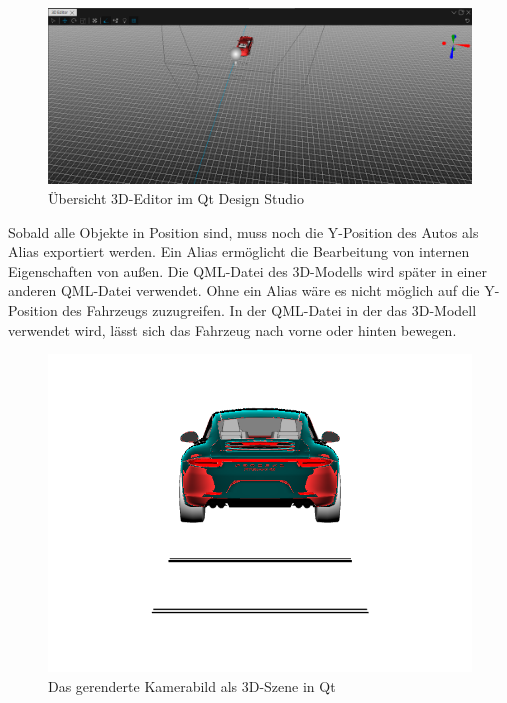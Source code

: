 \begin{figure}[htb]
	\centering
	\includegraphics[width=\textwidth]{img/4_hmi_tools/3d_editor}
	\caption[3D-Editor in Qt]{Übersicht 3D-Editor im Qt Design Studio}
	\label{fig:qt_3d}
\end{figure}

Sobald alle Objekte in Position sind, muss noch die Y-Position des Autos als Alias exportiert werden. Ein Alias ermöglicht die Bearbeitung von internen Eigenschaften von außen. Die QML-Datei des 3D-Modells wird später in einer anderen QML-Datei verwendet. Ohne ein Alias wäre es nicht möglich auf die Y-Position des Fahrzeugs zuzugreifen. In der QML-Datei in der das 3D-Modell verwendet wird, lässt sich das Fahrzeug nach vorne oder hinten bewegen.\\

\begin{figure}[htb]
	\centering
	\includegraphics[width=\textwidth]{img/4_hmi_tools/qt_3d_render}
	\caption[Gerendertes Kamerabild einer 3D-Szene in Qt]{Das gerenderte Kamerabild als 3D-Szene in Qt}
	\label{fig:qt_render}
\end{figure}

